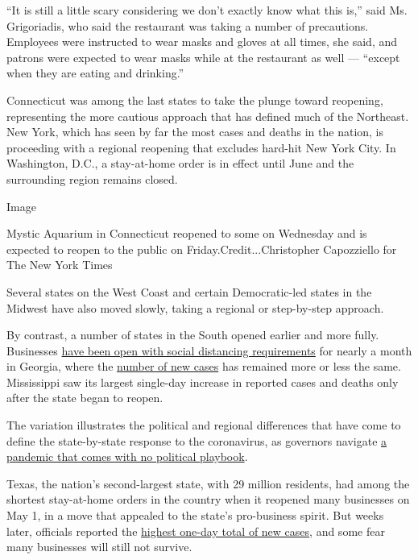 ``It is still a little scary considering we don't exactly know what this
is,'' said Ms. Grigoriadis, who said the restaurant was taking a number
of precautions. Employees were instructed to wear masks and gloves at
all times, she said, and patrons were expected to wear masks while at
the restaurant as well --- ``except when they are eating and drinking.''

Connecticut was among the last states to take the plunge toward
reopening, representing the more cautious approach that has defined much
of the Northeast. New York, which has seen by far the most cases and
deaths in the nation, is proceeding with a regional reopening that
excludes hard-hit New York City. In Washington, D.C., a stay-at-home
order is in effect until June and the surrounding region remains closed.

Image

Mystic Aquarium in Connecticut reopened to some on Wednesday and is
expected to reopen to the public on Friday.Credit...Christopher
Capozziello for The New York Times

Several states on the West Coast and certain Democratic-led states in
the Midwest have also moved slowly, taking a regional or step-by-step
approach.

By contrast, a number of states in the South opened earlier and more
fully. Businesses
\href{https://www.nytimes3xbfgragh.onion/2020/04/24/us/coronavirus-georgia-oklahoma-alaska-reopen.html}{have
been open with social distancing requirements} for nearly a month in
Georgia, where the
\href{https://www.nytimes3xbfgragh.onion/interactive/2020/us/georgia-coronavirus-cases.html}{number
of new cases} has remained more or less the same. Mississippi saw its
largest single-day increase in reported cases and deaths only after the
state began to reopen.

The variation illustrates the political and regional differences that
have come to define the state-by-state response to the coronavirus, as
governors navigate
\href{https://www.nytimes3xbfgragh.onion/2020/05/17/us/coronavirus-states-reopen.html}{a
pandemic that comes with no political playbook}.

Texas, the nation's second-largest state, with 29 million residents, had
among the shortest stay-at-home orders in the country when it reopened
many businesses on May 1, in a move that appealed to the state's
pro-business spirit. But weeks later, officials reported the
\href{https://www.texastribune.org/2020/05/17/coronavirus-updates-texas/}{highest
one-day total of new cases}, and some fear many businesses will still
not survive.

